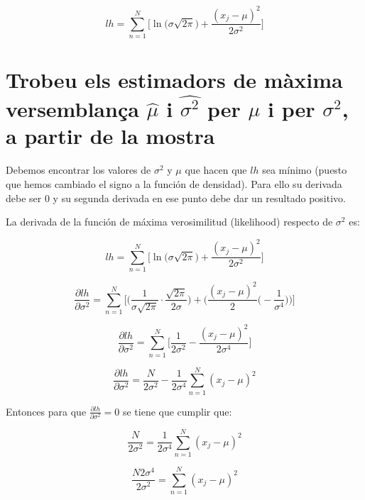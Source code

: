 \documentclass[a4paper,10pt]{article}
\begin{document}
\begin{equation*}
lh = \sum_{n = 1}^{N} \Big[ \ln{\big(  \sigma\sqrt{2\pi} \big)} + \frac{(x_j - \mu)^2}{2\sigma^2} \Big]
\end{equation*}

\section{Trobeu els estimadors de màxima versemblança $\hat{\mu}$ i $\hat{\sigma^2}$ per $\mu$ i per $\sigma^2$, a partir de la mostra}

Debemos encontrar los valores de $\sigma^2$ y $\mu$ que hacen que $lh$ sea mínimo (puesto que hemos cambiado el signo a la función de densidad). Para ello su derivada debe ser $0$ y su segunda derivada en ese punto debe dar un resultado positivo.

La derivada de la función de máxima verosimilitud (likelihood) respecto de $\sigma^2$ es:

\begin{equation*}
lh = \sum_{n = 1}^{N} \Big[ \ln{\big(  \sigma\sqrt{2\pi} \big)} + \frac{(x_j - \mu)^2}{2\sigma^2} \Big]
\end{equation*}

\begin{equation*}
\frac{\partial lh}{\partial \sigma^2} = \sum_{n = 1}^{N} \Big[ \Big( \frac{1}{\sigma\sqrt{2\pi}} \cdot \frac{\sqrt{2\pi}}{2\sigma} \Big) + \Big( \frac{(x_j - \mu)^2}{2} \big( -\frac{1}{\sigma^4}\big)\Big)\Big]
\end{equation*}

\begin{equation*}
\frac{\partial lh}{\partial \sigma^2} = \sum_{n = 1}^{N} \Big[ \frac{1}{2\sigma^2} - \frac{(x_j - \mu)^2}{2\sigma^4} \Big]
\end{equation*}

\begin{equation*}
\frac{\partial lh}{\partial \sigma^2} = \frac{N}{2\sigma^2} - \frac{1}{2\sigma^4}\sum_{n = 1}^{N} (x_j - \mu)^2
\end{equation*}

Entonces para que $\frac{\partial lh}{\partial \sigma^2} = 0 $ se tiene que cumplir que:

\begin{equation*}
\frac{N}{2\sigma^2} = \frac{1}{2\sigma^4}\sum_{n = 1}^{N} (x_j - \mu)^2
\end{equation*}

\begin{equation*}
\frac{N2\sigma^4}{2\sigma^2} = \sum_{n = 1}^{N} (x_j - \mu)^2
\end{equation*}
\end{document}
